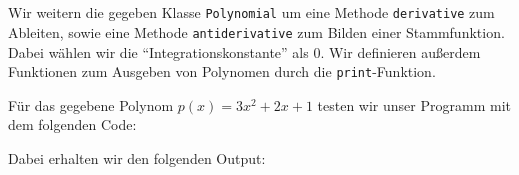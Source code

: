 \section{}

Wir weitern die gegeben Klasse \texttt{Polynomial} um eine Methode \texttt{derivative} zum Ableiten, sowie eine Methode \texttt{antiderivative} zum Bilden einer Stammfunktion.
Dabei wählen wir die \enquote{Integrationskonstante} als $0$.
Wir definieren außerdem Funktionen zum Ausgeben von Polynomen durch die \texttt{print}-Funktion.



Für das gegebene Polynom $p(x) = 3 x^2 + 2 x + 1$ testen wir unser Programm mit dem folgenden Code:



Dabei erhalten wir den folgenden Output:






